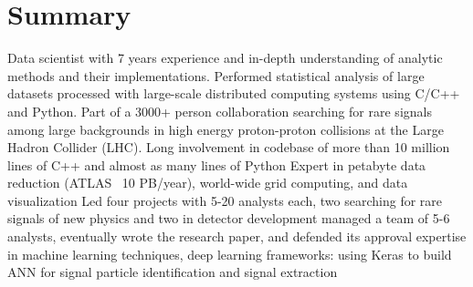 \documentclass{myfancycv}
\begin{document}
\makeheader
\vspace*{-.35em}

  \vspace*{-0.5em}
\section{Summary}

Data scientist with 7 years experience and in-depth understanding of analytic methods and their implementations.
Performed statistical analysis of large datasets processed with large-scale distributed computing systems using C/C++ and Python.
Part of a 3000+ person collaboration searching for rare signals among large backgrounds in high energy proton-proton collisions at the Large Hadron Collider (LHC).
Long involvement in codebase of more than 10 million lines of C++ and almost as many lines of Python
Expert in petabyte data reduction (ATLAS ~10 PB/year), world-wide grid computing, and data visualization
Led four projects with 5-20 analysts each, two searching for rare signals of new physics and two in detector development
managed a team of 5-6 analysts, eventually wrote the research paper, and defended its approval
expertise in machine learning techniques, deep learning frameworks: using Keras to build ANN for signal particle identification and signal extraction
\end{document}
